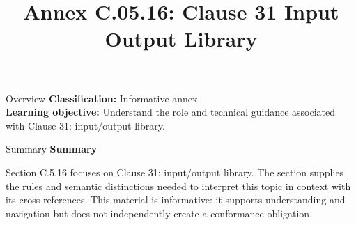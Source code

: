 \documentclass[10pt,letterpaper]{article}
\title{Annex C.05.16: Clause 31 Input Output Library}
\author{}
\date{}
\begin{document}
\maketitle
\begin{CornellOverviewBox}{Overview}
\textbf{Classification:} Informative annex\\[2pt]
\textbf{Learning objective:} Understand the role and technical guidance associated with Clause 31: input/output library.
\end{CornellOverviewBox}\begin{CornellSummaryBox}{Summary}
{\sffamily\bfseries\color{Accent} Summary}\par\vspace{3pt}Section C.5.16 focuses on Clause 31: input/output library. The section supplies the rules and semantic distinctions needed to interpret this topic in context with its cross-references. This material is informative: it supports understanding and navigation but does not independently create a conformance obligation.
\end{CornellSummaryBox}
\end{document}
